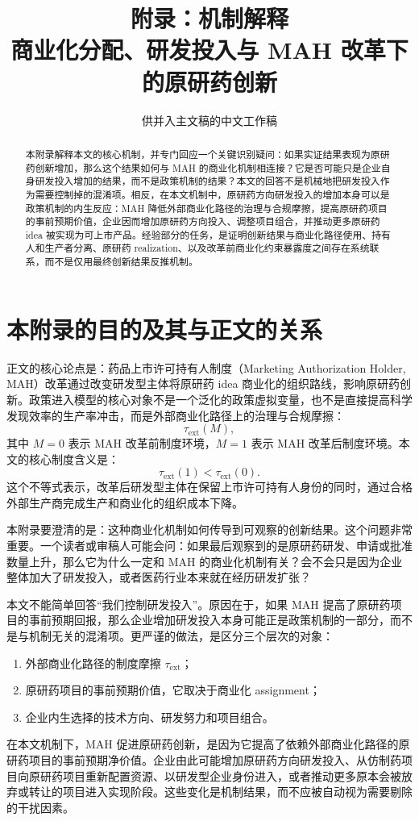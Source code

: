 \documentclass[12pt]{article}
\title{附录：机制解释\\商业化分配、研发投入与 MAH 改革下的原研药创新}
\author{}
\date{供并入主文稿的中文工作稿}
\newcommand{\tauext}{\tau_{\mathrm{ext}}}
\begin{document}
\maketitle

\begin{abstract}
\noindent
本附录解释本文的核心机制，并专门回应一个关键识别疑问：如果实证结果表现为原研药创新增加，那么这个结果如何与 MAH 的商业化机制相连接？它是否可能只是企业自身研发投入增加的结果，而不是政策机制的结果？本文的回答不是机械地把研发投入作为需要控制掉的混淆项。相反，在本文机制中，原研药方向研发投入的增加本身可以是政策机制的内生反应：MAH 降低外部商业化路径的治理与合规摩擦，提高原研药项目的事前预期价值，企业因而增加原研药方向投入、调整项目组合，并推动更多原研药 idea 被实现为可上市产品。经验部分的任务，是证明创新结果与商业化路径使用、持有人和生产者分离、原研药 realization、以及改革前商业化约束暴露度之间存在系统联系，而不是仅用最终创新结果反推机制。
\end{abstract}

\section{本附录的目的及其与正文的关系}

正文的核心论点是：药品上市许可持有人制度（Marketing Authorization Holder, MAH）改革通过改变研发型主体将原研药 idea 商业化的组织路线，影响原研药创新。政策进入模型的核心对象不是一个泛化的政策虚拟变量，也不是直接提高科学发现效率的生产率冲击，而是外部商业化路径上的治理与合规摩擦：
\[
\tauext(M),
\]
其中 $M=0$ 表示 MAH 改革前制度环境，$M=1$ 表示 MAH 改革后制度环境。本文的核心制度含义是：
\[
\tauext(1)<\tauext(0).
\]
这个不等式表示，改革后研发型主体在保留上市许可持有人身份的同时，通过合格外部生产商完成生产和商业化的组织成本下降。

本附录要澄清的是：这种商业化机制如何传导到可观察的创新结果。这个问题非常重要。一个读者或审稿人可能会问：如果最后观察到的是原研药研发、申请或批准数量上升，那么它为什么一定和 MAH 的商业化机制有关？会不会只是因为企业整体加大了研发投入，或者医药行业本来就在经历研发扩张？

本文不能简单回答“我们控制研发投入”。原因在于，如果 MAH 提高了原研药项目的事前预期回报，那么企业增加研发投入本身可能正是政策机制的一部分，而不是与机制无关的混淆项。更严谨的做法，是区分三个层次的对象：
\begin{enumerate}
    \item 外部商业化路径的制度摩擦 $\tauext$；
    \item 原研药项目的事前预期价值，它取决于商业化 assignment；
    \item 企业内生选择的技术方向、研发努力和项目组合。
\end{enumerate}
在本文机制下，MAH 促进原研药创新，是因为它提高了依赖外部商业化路径的原研药项目的事前预期净价值。企业由此可能增加原研药方向研发投入、从仿制药项目向原研药项目重新配置资源、以研发型企业身份进入，或者推动更多原本会被放弃或转让的项目进入实现阶段。这些变化是机制结果，而不应被自动视为需要剔除的干扰因素。
\end{document}
